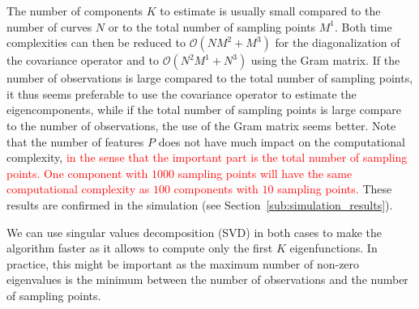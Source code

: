 The number of components $K$ to estimate is usually small compared to the number of curves $N$ or to the total number of sampling points $M^1$. Both time complexities can then be reduced to $\mathcal{O}(NM^2 + M^3)$ for the diagonalization of the covariance operator and to $\mathcal{O}(N^2M^1 + N^3)$ using the Gram matrix. If the number of observations is large compared to the total number of sampling points, it thus seems preferable to use the covariance operator to estimate the eigencomponents, while if the total number of sampling points is large compare to the number of observations, the use of the Gram matrix seems better. Note that the number of features $P$ does not have much impact on the computational complexity, \textcolor{red}{in the sense that the important part is the total number of sampling points. One component with $1000$ sampling points will have the same computational complexity as $100$ components with $10$ sampling points.} These results are confirmed in the simulation (see Section~\ref{sub:simulation_results}).

\begin{remark}
We can use singular values decomposition (SVD) in both cases to make the algorithm faster as it allows to compute only the first $K$ eigenfunctions. In practice, this might be important as the maximum number of non-zero eigenvalues is the minimum between the number of observations and the number of sampling points.
\end{remark}



